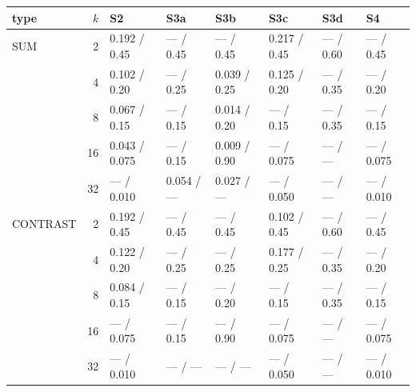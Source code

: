 \footnotesize
\begin{tabular}{lrllllll}
\toprule
type & $k$ & S2 & S3a & S3b & S3c & S3d & S4 \\
\midrule
SUM & 2 & 0.192 / 0.45 & --- / 0.45 & --- / 0.45 & 0.217 / 0.45 & --- / 0.60 & --- / 0.45 \\
 & 4 & 0.102 / 0.20 & --- / 0.25 & 0.039 / 0.25 & 0.125 / 0.20 & --- / 0.35 & --- / 0.20 \\
 & 8 & 0.067 / 0.15 & --- / 0.15 & 0.014 / 0.20 & --- / 0.15 & --- / 0.35 & --- / 0.15 \\
 & 16 & 0.043 / 0.075 & --- / 0.15 & 0.009 / 0.90 & --- / 0.075 & --- / --- & --- / 0.075 \\
 & 32 & --- / 0.010 & 0.054 / --- & 0.027 / --- & --- / 0.050 & --- / --- & --- / 0.010 \\
\midrule
CONTRAST & 2 & 0.192 / 0.45 & --- / 0.45 & --- / 0.45 & 0.102 / 0.45 & --- / 0.60 & --- / 0.45 \\
 & 4 & 0.122 / 0.20 & --- / 0.25 & --- / 0.25 & 0.177 / 0.25 & --- / 0.35 & --- / 0.20 \\
 & 8 & 0.084 / 0.15 & --- / 0.15 & --- / 0.20 & --- / 0.15 & --- / 0.35 & --- / 0.15 \\
 & 16 & --- / 0.075 & --- / 0.15 & --- / 0.90 & --- / 0.075 & --- / --- & --- / 0.075 \\
 & 32 & --- / 0.010 & --- / --- & --- / --- & --- / 0.050 & --- / --- & --- / 0.010 \\
\bottomrule
\end{tabular}
